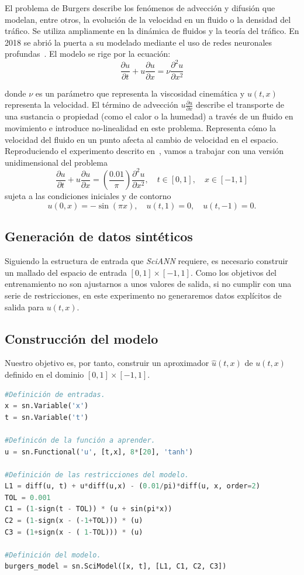 El problema de Burgers describe los fenómenos de advección y difusión que modelan, entre otros, la evolución de la velocidad en un fluido o la densidad del tráfico. Se utiliza ampliamente en la dinámica de fluidos y la teoría del tráfico. En 2018 se abrió la puerta a su modelado mediante el uso de redes neuronales profundas~\cite{Raissi2018}. El modelo se rige por la ecuación:
\begin{equation}
\frac{\partial u}{\partial t} + u \frac{\partial u}{\partial x} = \nu \frac{\partial^2 u}{\partial x^2}
\end{equation}

donde $\nu$ es un parámetro que representa la viscosidad cinemática y $u(t,x)$ representa la velocidad. El término de advección $u \frac{\partial u}{\partial x}$  describe el transporte de una sustancia o propiedad (como el calor o la humedad) a través de un fluido en movimiento e introduce no-linealidad en este problema. Representa cómo la velocidad del fluido en un punto afecta al cambio de velocidad en el espacio. Reproduciendo el experimento descrito en~\cite{Raissi2018}, vamos a trabajar con una versión unidimensional del problema 
$$
\frac{\partial u}{\partial t} + u \frac{\partial u}{\partial x} = (\frac{0.01}{\pi}) \frac{\partial^2 u}{\partial x^2}, \quad t \in [0, 1],\quad x \in [-1,1]
$$
sujeta a las condiciones iniciales y de contorno
$$
u(0, x) = -\sin(\pi x), \quad u(t, 1) = 0, \quad u(t, -1) = 0.
$$
\subsection{Generación de datos sintéticos}

Siguiendo la estructura de entrada que \textit{SciANN} requiere, es necesario construir un mallado del espacio de entrada $[0,1]\times[-1,1]$. Como los objetivos del entrenamiento no son ajustarnos a unos valores de salida, si no cumplir con una serie de restricciones, en este experimento no generaremos datos explícitos de salida para $u(t,x)$. 

\subsection{Construcción del modelo}
Nuestro objetivo es, por tanto, construir un aproximador 
$\hat{u}(t, x)$ de $u(t,x)$ definido en el dominio $[0,1]\times[-1,1]$.
\begin{lstlisting}[language=Python,caption={Modelo en \textit{SciANN} para el problema de Burgers.},label={lst:exp2}]
#Definición de entradas.
x = sn.Variable('x')
t = sn.Variable('t')

#Definicón de la función a aprender.
u = sn.Functional('u', [t,x], 8*[20], 'tanh')

#Definición de las restricciones del modelo. 
L1 = diff(u, t) + u*diff(u,x) - (0.01/pi)*diff(u, x, order=2)
TOL = 0.001
C1 = (1-sign(t - TOL)) * (u + sin(pi*x))
C2 = (1-sign(x - (-1+TOL))) * (u)
C3 = (1+sign(x - ( 1-TOL))) * (u)

#Definición del modelo.
burgers_model = sn.SciModel([x, t], [L1, C1, C2, C3])
\end{lstlisting}

